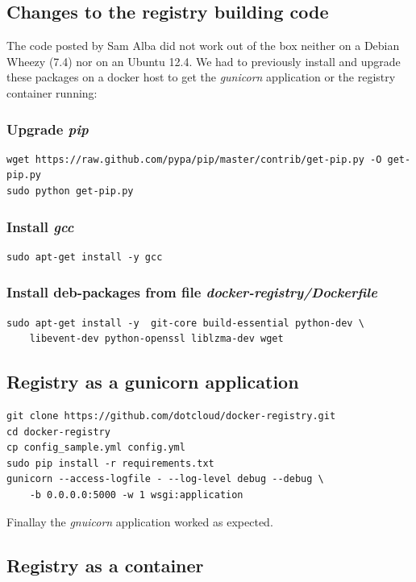 \documentclass[11pt]{article}
\begin{document}
\subsection{Changes to the registry building code}
\label{sec-3-3}

The code posted by Sam Alba did not work out of the box neither on a Debian Wheezy (7.4) nor on an Ubuntu 12.4. We had to previously install and upgrade these packages on a docker host to get the \emph{gunicorn} application or the registry container running:
\subsubsection{Upgrade \emph{pip}}
\label{sec-3-3-1}


\begin{verbatim}
wget https://raw.github.com/pypa/pip/master/contrib/get-pip.py -O get-pip.py
sudo python get-pip.py
\end{verbatim}
\subsubsection{Install \emph{gcc}}
\label{sec-3-3-2}


\begin{verbatim}
sudo apt-get install -y gcc
\end{verbatim}
\subsubsection{Install deb-packages from file \emph{docker-registry/Dockerfile}}
\label{sec-3-3-3}


\begin{verbatim}
sudo apt-get install -y  git-core build-essential python-dev \
    libevent-dev python-openssl liblzma-dev wget
\end{verbatim}
\subsection{Registry as a  gunicorn application}
\label{sec-3-4}


\begin{verbatim}
git clone https://github.com/dotcloud/docker-registry.git
cd docker-registry
cp config_sample.yml config.yml
sudo pip install -r requirements.txt
gunicorn --access-logfile - --log-level debug --debug \
    -b 0.0.0.0:5000 -w 1 wsgi:application
\end{verbatim}
Finallay the \emph{gnuicorn} application worked as expected.
\subsection{Registry as a container}
\label{sec-3-5}
\end{document}
